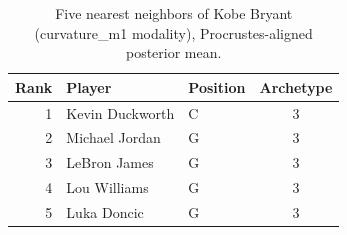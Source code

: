 \begin{table}[htbp]
  \centering\small
  \begin{tabular}{rllc}
    \toprule
    Rank & Player & Position & Archetype \\
    \midrule
    1 & Kevin Duckworth & C & 3 \\
    2 & Michael Jordan & G & 3 \\
    3 & LeBron James & G & 3 \\
    4 & Lou Williams & G & 3 \\
    5 & Luka Doncic & G & 3 \\
    \bottomrule
  \end{tabular}
  \caption{Five nearest neighbors of Kobe Bryant (curvature_m1 modality), Procrustes-aligned posterior mean.}
  \label{tab:Kobe_Bryant_neighbors_curvature_m1}
\end{table}

